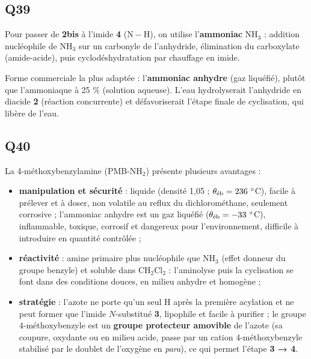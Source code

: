 \documentclass[11pt,a4paper]{article}
\providecommand{\tightlist}{\setlength{\itemsep}{0pt}\setlength{\parskip}{0pt}}
\begin{document}
\hypertarget{q39}{%
\subsection{Q39}\label{q39}}

Pour passer de \textbf{2bis} à l'imide \textbf{4} (\(\mathrm{N{-}H}\)), on utilise l'\textbf{ammoniac} \(\mathrm{NH_3}\) : addition nucléophile de \(\mathrm{NH_3}\) sur un carbonyle de l'anhydride, élimination du carboxylate (amide-acide), puis cyclodéshydratation par chauffage en imide.

Forme commerciale la plus adaptée : l'\textbf{ammoniac anhydre} (gaz liquéfié), plutôt que l'ammoniaque à 25 \% (solution aqueuse). L'eau hydrolyserait l'anhydride en diacide \textbf{2} (réaction concurrente) et défavoriserait l'étape finale de cyclisation, qui libère de l'eau.

\hypertarget{q40}{%
\subsection{Q40}\label{q40}}

La 4-méthoxybenzylamine (PMB-\(\mathrm{NH_2}\)) présente plusieurs avantages :

\begin{itemize}
\tightlist
\item
  \textbf{manipulation et sécurité} : liquide (densité 1,05 ; \(\theta_{\rm \text{éb}}=236\ ^\circ\)C), facile à prélever et à doser, non volatile au reflux du dichlorométhane, seulement corrosive ; l'ammoniac anhydre est un gaz liquéfié (\(\theta_{\rm \text{éb}}=-33\ ^\circ\)C), inflammable, toxique, corrosif et dangereux pour l'environnement, difficile à introduire en quantité contrôlée ;
\item
  \textbf{réactivité} : amine primaire plus nucléophile que \(\mathrm{NH_3}\) (effet donneur du groupe benzyle) et soluble dans \(\mathrm{CH_2Cl_2}\) : l'aminolyse puis la cyclisation se font dans des conditions douces, en milieu anhydre et homogène ;
\item
  \textbf{stratégie} : l'azote ne porte qu'un seul H après la première acylation et ne peut former que l'imide \(N\)-substitué \textbf{3}, lipophile et facile à purifier ; le groupe 4-méthoxybenzyle est un \textbf{groupe protecteur amovible} de l'azote (sa coupure, oxydante ou en milieu acide, passe par un cation 4-méthoxybenzyle stabilisé par le doublet de l'oxygène en \emph{para}), ce qui permet l'étape \textbf{3 → 4}.
\end{itemize}
\end{document}
